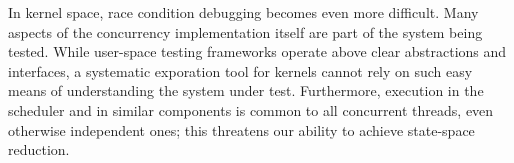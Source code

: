 \documentclass{llncs}
\begin{document}

In kernel space, race condition debugging becomes even more difficult. Many aspects of the concurrency implementation itself are part of the system being tested.
While user-space testing frameworks operate above clear abstractions and interfaces, a systematic exporation tool for kernels cannot rely on such easy means of understanding the system under test.
Furthermore, execution in the scheduler and in similar components is common to all concurrent threads, even otherwise independent ones; this threatens our ability to achieve state-space reduction.


\end{document}
